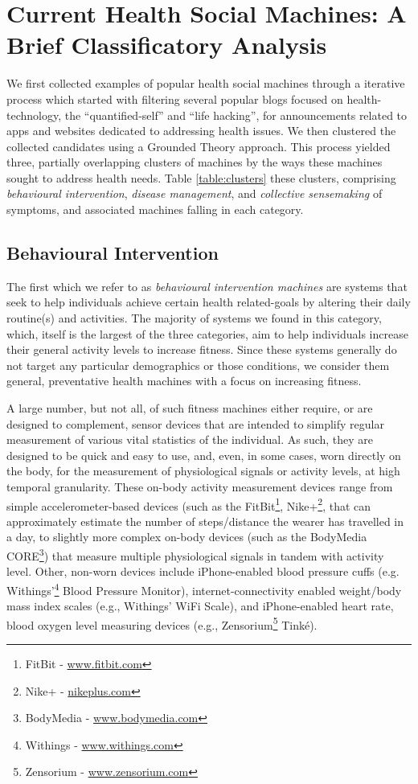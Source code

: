 \documentclass{sig-alternate}
\begin{document}
\section{Current Health Social Machines: A Brief Classificatory Analysis}

We first collected examples of popular health social machines through
a iterative process which started with filtering several popular blogs
focused on health-technology, the ``quantified-self'' and ``life
hacking'', for announcements related to apps and websites dedicated to
addressing health issues. We then clustered the collected candidates
using a Grounded Theory approach.  This process yielded three,
partially overlapping clusters of machines by the ways these machines
sought to address health needs.  Table \ref{table:clusters} these
clusters, comprising \emph{behavioural intervention}, \emph{disease
  management}, and \emph{collective sensemaking} of symptoms, and
associated machines falling in each category.

\subsection{Behavioural Intervention}

The first which we refer to as \emph{behavioural intervention
  machines} are systems that seek to help individuals achieve certain
health related-goals by altering their daily routine(s) and
activities.  The majority of systems we found in this category, which,
itself is the largest of the three categories, aim to help individuals
increase their general activity levels to increase fitness.  Since
these systems generally do not target any particular demographics or
those conditions, we consider them general, preventative health
machines with a focus on increasing fitness.

A large number, but not all, of such fitness machines either require,
or are designed to complement, sensor devices that are intended to
simplify regular measurement of various vital statistics of the
individual.  As such, they are designed to be quick and easy to use,
and, even, in some cases, worn directly on the body, for the
measurement of physiological signals or activity levels, at high
temporal granularity. These on-body activity measurement devices range
from simple accelerometer-based devices (such as the
FitBit\footnote{FitBit - \url{www.fitbit.com}}, Nike+\footnote{Nike+ -
  \url{nikeplus.com}}, that can approximately estimate the number of
steps/distance the wearer has travelled in a day, to slightly more
complex on-body devices (such as the BodyMedia CORE\footnote{BodyMedia
  - \url{www.bodymedia.com}}) that measure multiple physiological
signals in tandem with activity level.  Other, non-worn devices
include iPhone-enabled blood pressure cuffs
(e.g. Withings'\footnote{Withings - \url{www.withings.com}} Blood
Pressure Monitor), internet-connectivity enabled weight/body mass
index scales (e.g., Withings' WiFi Scale), and iPhone-enabled heart
rate, blood oxygen level measuring devices (e.g.,
Zensorium\footnote{Zensorium - \url{www.zensorium.com}} Tink\'{e}).
\end{document}
